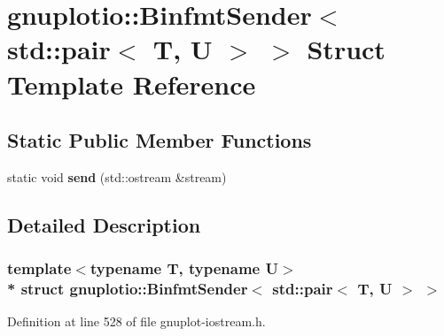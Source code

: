 \hypertarget{structgnuplotio_1_1_binfmt_sender_3_01std_1_1pair_3_01_t_00_01_u_01_4_01_4}{}\section{gnuplotio\+:\+:Binfmt\+Sender$<$ std\+:\+:pair$<$ T, U $>$ $>$ Struct Template Reference}
\label{structgnuplotio_1_1_binfmt_sender_3_01std_1_1pair_3_01_t_00_01_u_01_4_01_4}
\subsection*{Static Public Member Functions}
\begin{DoxyCompactItemize}
\item 
static void {\bfseries send} (std\+::ostream \&stream)\hypertarget{structgnuplotio_1_1_binfmt_sender_3_01std_1_1pair_3_01_t_00_01_u_01_4_01_4_a08b2bedbc54824cd202c664116e37243}{}\label{structgnuplotio_1_1_binfmt_sender_3_01std_1_1pair_3_01_t_00_01_u_01_4_01_4_a08b2bedbc54824cd202c664116e37243}

\end{DoxyCompactItemize}


\subsection{Detailed Description}
\subsubsection*{template$<$typename T, typename U$>$\\*
struct gnuplotio\+::\+Binfmt\+Sender$<$ std\+::pair$<$ T, U $>$ $>$}



Definition at line 528 of file gnuplot-\/iostream.\+h.

